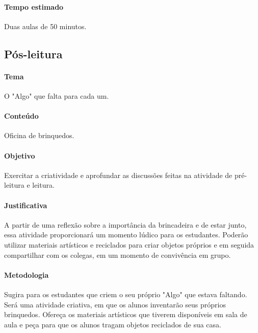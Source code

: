\documentclass[11pt]{extarticle}
\begin{document}

\paragraph{Tempo estimado} Duas aulas de 50 minutos.

\subsection{Pós-leitura}


\paragraph{Tema} O "Algo" que falta para cada um.

\paragraph{Conteúdo} Oficina de brinquedos.

\paragraph{Objetivo} Exercitar a criatividade e aprofundar as discussões feitas na atividade de pré-leitura e leitura.

\paragraph{Justificativa} A partir de uma reflexão sobre a importância da brincadeira e de estar junto, essa atividade proporcionará um momento lúdico para os estudantes. Poderão utilizar materiais artísticos e reciclados para criar objetos próprios e em seguida compartilhar com os colegas, em um momento de convivência em grupo.

\paragraph{Metodologia} Sugira para os estudantes que criem o seu próprio "Algo" que estava faltando. Será uma atividade criativa, em que os alunos inventarão seus próprios brinquedos. Ofereça os materiais artísticos que tiverem disponíveis em sala de aula e peça para que os alunos tragam objetos reciclados de sua casa.
\end{document}
